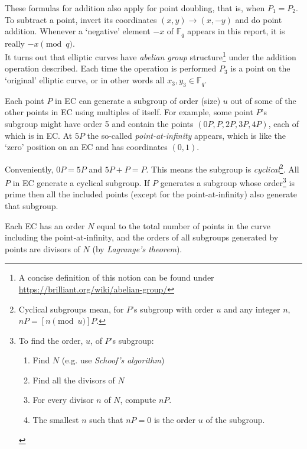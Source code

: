 These formulas for addition also apply for point doubling, that is, when  \(P_1 = P_2\). To subtract a point, invert its coordinates $(x,y) \rightarrow (x,-y)$ and do point addition. Whenever a `negative' element $-x$ of $\mathbb{F}_q$ appears in this report, it is really $-x \pmod{q}$.
\\

It turns out that elliptic curves have {\em abelian group} structure\footnote{\label{abelian_note}A concise definition of this notion can be found under \url{https://brilliant.org/wiki/abelian-group/}} under the addition operation described. Each time the operation is performed $P_3$ is a point on the `original' elliptic curve, or in other words all $x_3,y_3 \in \mathbb{F}_q$.

Each point $P$ in EC can generate a subgroup of order (size) $u$ out of some of the other points in EC using multiples of itself. For example, some point $P$’s subgroup might have order 5 and contain the points $(0P, P, 2P, 3P, 4P)$, each of which is in EC. At $5P$ the so-called {\em point-at-infinity} appears, which is like the `zero’ position on an EC and has coordinates $(0, 1)$. 

Conveniently, $0P = 5P$ and $5P + P = P$. This means the subgroup is {\em cyclical}\footnote{\label{cyclical_note}Cyclical subgroups mean, for $P$'s subgroup with order $u$ and any integer $n$, $n P = [n \pmod{u}] P$.}. All $P$ in EC generate a cyclical subgroup. If $P$ generates a subgroup whose order\footnote{\label{find_order_note}To find the order, $u$, of $P$'s subgroup:
\begin{enumerate}
    \item Find $N$ (e.g. use {\em Schoof's algorithm}) 
    \item Find all the divisors of $N$
    \item For every divisor $n$ of $N$, compute $n P$.
    \item The smallest $n$ such that $n P = 0$ is the order $u$ of the subgroup.
\end{enumerate}} is prime then all the included points (except for the point-at-infinity) also generate that subgroup.

Each EC has an order $N$ equal to the total number of points in the curve including the point-at-infinity, and the orders of all subgroups generated by points are divisors of $N$ (by {\em Lagrange’s theorem}). 

